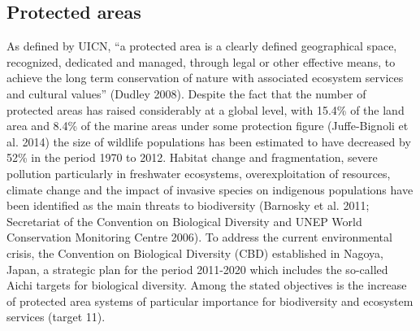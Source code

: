 \documentclass[]{interact}
\theoremstyle{plain}%
\theoremstyle{definition}
\theoremstyle{remark}
\begin{document}
\subsection{Protected areas}\label{protected-areas}

As defined by UICN, ``a protected area is a clearly defined geographical
space, recognized, dedicated and managed, through legal or other
effective means, to achieve the long term conservation of nature with
associated ecosystem services and cultural values'' (Dudley 2008).
Despite the fact that the number of protected areas has raised
considerably at a global level, with 15.4\% of the land area and 8.4\%
of the marine areas under some protection figure (Juffe-Bignoli et al.
2014) the size of wildlife populations has been estimated to have
decreased by 52\% in the period 1970 to 2012. Habitat change and
fragmentation, severe pollution particularly in freshwater ecosystems,
overexploitation of resources, climate change and the impact of invasive
species on indigenous populations have been identified as the main
threats to biodiversity (Barnosky et al. 2011; Secretariat of the
Convention on Biological Diversity and UNEP World Conservation
Monitoring Centre 2006). To address the current environmental crisis,
the Convention on Biological Diversity (CBD) established in Nagoya,
Japan, a strategic plan for the period 2011-2020 which includes the
so-called Aichi targets for biological diversity. Among the stated
objectives is the increase of protected area systems of particular
importance for biodiversity and ecosystem services (target 11).
\end{document}
